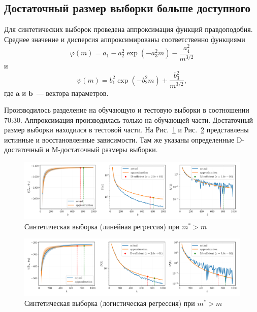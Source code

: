 \subsection{Достаточный размер выборки больше доступного}

Для синтетических выборок проведена аппроксимация функций правдоподобия. Среднее значение и дисперсия аппроксимированы соответственно функциями
\[ \varphi(m) = a_1 - a_2^2 \exp\left( - a_3^2 m \right) - \dfrac{a_4^2}{m^{3/2}} \]
и
\[ \psi(m) = b_1^2 \exp\left( - b_2^2 m \right) + \dfrac{b_3^2}{m^{3/2}}, \]
где $\mathbf{a}$ и $\mathbf{b}$~--- вектора параметров.

Производилось разделение на обучающую и тестовую выборки в соотношении 70:30. Аппроксимация производилась только на обучающей части. Достаточный размер выборки находился в тестовой части. На Рис.~\ref{synthetic-regression-approximation} и Рис.~\ref{synthetic-classification-approximation} представлены истинные и восстановленные зависимости. Там же указаны определенные D-достаточный и M-достаточный размеры выборки.

\begin{figure}[h!]
    \centering
    \includegraphics[width=\textwidth]{figures/synthetic-regression-approximation.pdf}
    \caption{Синтетическая выборка (линейная регрессия) при $m^* > m$}
    \label{synthetic-regression-approximation}
\end{figure}

\begin{figure}[h!]
    \centering
    \includegraphics[width=\textwidth]{figures/synthetic-classification-approximation.pdf}
    \caption{Синтетическая выборка (логистическая регрессия) при $m^* > m$}
    \label{synthetic-classification-approximation}
\end{figure}